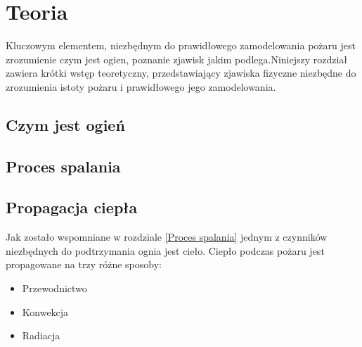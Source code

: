 ﻿\chapter{Teoria}
\label{cha:Teoria}
Kluczowym elementem, niezbędnym do prawidłowego zamodelowania pożaru
jest zrozumienie czym jest ogien, poznanie zjawisk jakim podlega.Niniejszy rozdział zawiera
krótki wstęp teoretyczny, przedstawiający zjawiska fizyczne niezbędne do zrozumienia istoty 
pożaru i prawidłowego jego zamodelowania.
\section {Czym jest ogień}
 \section {Proces spalania}
\section {Propagacja ciepła}
Jak zostało wspomniane w rozdziale \ref{Proces spalania} jednym z czynników niezbędnych
do podtrzymania ognia jest cieło. Ciepło podczas pożaru jest propagowane na trzy różne sposoby:
\begin {itemize}
\item Przewodnictwo
\item Konwekcja
\item Radiacja
\end {itemize}


